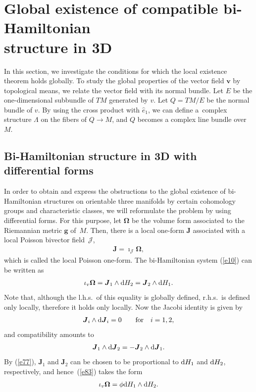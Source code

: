\documentclass[pdftex]{sigma}
\numberwithin{equation}{section}
\begin{document}
\section[Global existence of compatible bi-Hamiltonian structure in 3D]{Global existence of compatible bi-Hamiltonian\\ structure in 3D}\label{section3}

In this section, we investigate the conditions for which the local existence theorem holds globally. To study the global properties of the vector f\/ield $\boldsymbol{v}$ by topological means, we relate the vector f\/ield with its normal bundle. Let $E$ be the one-dimensional subbundle of $TM$ generated by $v$. Let $Q=TM/E$ be the normal bundle of $v$. By using the cross product with $\widehat{e}_{1}$, we can def\/ine a~complex structure $\Lambda$ on the f\/ibers of $Q\rightarrow M$, and $Q$ becomes a complex line bundle over~$M$.

\subsection{Bi-Hamiltonian structure in 3D with dif\/ferential forms}\label{section3.1}

In order to obtain and express the obstructions to the global existence of bi-Hamiltonian structures on orientable three manifolds by certain cohomology groups and characteristic classes, we will reformulate the problem by using dif\/ferential forms. For this purpose, let $\boldsymbol{\Omega }$ be the volume form associated to the Riemannian metric $\boldsymbol{g}$ of~$M$. Then, there is a local one-form $\boldsymbol{J}$ associated with a local Poisson bivector f\/ield~$\mathcal{J}$,
\begin{gather*}
\boldsymbol{J}=\imath _{\mathcal{J}}\boldsymbol{\Omega },
\end{gather*}
which is called the local Poisson one-form. The bi-Hamiltonian system (\ref{e10}) can be written as
\begin{gather}
\iota _{v}\boldsymbol{\Omega }=\boldsymbol{J}_{1}\wedge {\rm d}H_{2}=\boldsymbol{J}_{2}\wedge {\rm d}H_{1}. \label{e83}
\end{gather}
Note that, although the l.h.s.\ of this equality is globally def\/ined, r.h.s.\ is def\/ined only locally, therefore it holds only locally. Now the Jacobi identity is given by
\begin{gather}
\boldsymbol{J}_{i}\wedge {\rm d}\boldsymbol{J}_{i}=0\qquad \text{for} \quad i=1,2, \label{e84}
\end{gather}
and compatibility amounts to
\begin{gather*}
\boldsymbol{J}_{1}\wedge {\rm d}\boldsymbol{J}_{2}=-\boldsymbol{J}_{2}\wedge {\rm d}\boldsymbol{J}_{1}.
\end{gather*}
By (\ref{e77}), $\boldsymbol{J}_{1}$ and $\boldsymbol{J}_{2}$ can be chosen to be proportional to ${\rm d}H_{1}$ and ${\rm d}H_{2}$, respectively, and hence~(\ref{e83}) takes the form
\begin{gather*}
\iota _{v}\boldsymbol{\Omega }=\phi {\rm d}H_{1}\wedge {\rm d}H_{2}.
\end{gather*}
\end{document}
